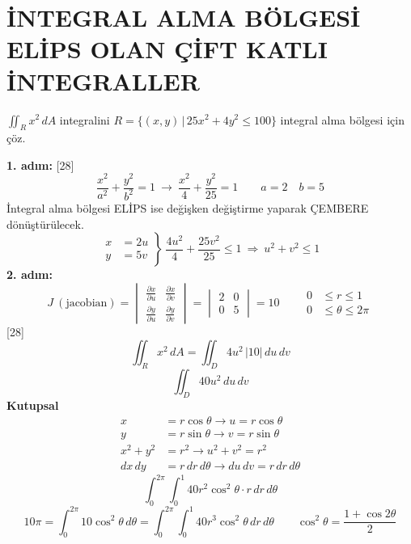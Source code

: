 \documentclass[11pt,a4paper]{article}
\begin{document}
\section{İNTEGRAL ALMA BÖLGESİ ELİPS OLAN ÇİFT KATLI İNTEGRALLER}
\begin{ornek}
$\displaystyle\iint_R x^2\,dA$ integralini $R=\{(x,y)\,|\,25x^2+4y^2\le100\}$ integral alma bölgesi için çöz.
\end{ornek}
\noindent\textbf{1. adım:}
[28]
\[ \frac{x^2}{a^2}+\frac{y^2}{b^2}=1\ \longrightarrow\ \frac{x^2}{4}+\frac{y^2}{25}=1\qquad a=2\quad b=5 \]
İntegral alma bölgesi ELİPS ise değişken değiştirme yaparak ÇEMBERE dönüştürülecek.
\[ \left.\begin{aligned}x&=2u\\y&=5v\end{aligned}\right\}\ \frac{4u^2}{4}+\frac{25v^2}{25}\le1\ \Rightarrow\ u^2+v^2\le1 \]
\noindent\textbf{2. adım:}
\[ J\ (\text{jacobian})=\begin{vmatrix}\frac{\partial x}{\partial u}&\frac{\partial x}{\partial v}\\[2pt]\frac{\partial y}{\partial u}&\frac{\partial y}{\partial v}\end{vmatrix}=\begin{vmatrix}2&0\\0&5\end{vmatrix}=10\qquad \begin{aligned}0&\le r\le1\\0&\le\theta\le2\pi\end{aligned} \]
[28]
\[ \iint_R x^2\,dA=\iint_D 4u^2\,|10|\,du\,dv \]
\[ \iint_D 40u^2\,du\,dv \]
\noindent\textbf{Kutupsal}
\begin{align*}
x&=r\cos\theta\longrightarrow u=r\cos\theta\\
y&=r\sin\theta\longrightarrow v=r\sin\theta\\
x^2+y^2&=r^2\longrightarrow u^2+v^2=r^2\\
dx\,dy&=r\,dr\,d\theta\longrightarrow du\,dv=r\,dr\,d\theta
\end{align*}
\[ \int_0^{2\pi}\!\!\int_0^1 40r^2\cos^2\theta\cdot r\,dr\,d\theta \]
\[ 10\pi=\int_0^{2\pi}10\cos^2\theta\,d\theta=\int_0^{2\pi}\!\!\int_0^1 40r^3\cos^2\theta\,dr\,d\theta\qquad \cos^2\theta=\frac{1+\cos2\theta}{2} \]
\end{document}
